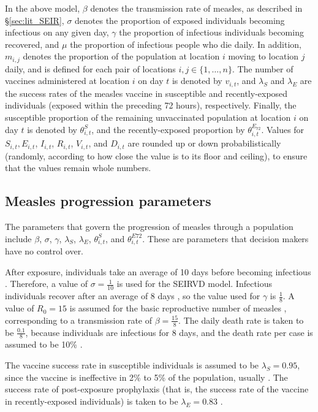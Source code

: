 In the above model, $\beta$ denotes the transmission rate of measles, as described in \S \ref{sec:lit_SEIR}, $\sigma$ denotes the proportion of exposed individuals becoming infectious on any given day, $\gamma$ the proportion of infectious individuals becoming recovered, and $\mu$ the proportion of infectious people who die daily. In addition, $m_{i,j}$ denotes the proportion of the population at location $i$ moving to location $j$ daily, and is defined for each pair of locations $i,j \in \{1,\dots,n \}$. 
The number of vaccines administered at location $i$ on day $t$ is denoted by $v_{i,t}$, and $\lambda_{S}$ and $\lambda_{E}$ are the success rates of the measles vaccine in susceptible and recently-exposed individuals (exposed within the preceding 72 hours), respectively. Finally, the susceptible proportion of the remaining unvaccinated population at location $i$ on day $t$ is denoted by $\theta^{S}_{i,t}$, and the recently-exposed proportion by $\theta^{E_{72}}_{i,t}$. Values for $S_{i,t}, E_{i,t}$, $I_{i,t}$, $R_{i,t}$, $V_{i,t}$, and $D_{i,t}$ are rounded up or down probabilistically (randomly, according to how close the value is to its floor and ceiling), to ensure that the values remain whole numbers. 

\subsection{Measles progression parameters} %
The parameters that govern the progression of measles through a population include $\beta$, $\sigma$, $\gamma$, $\lambda_{S}$, $\lambda_{E}$, $\theta^{S}_{i,t}$, and $\theta^{E72}_{i,t}$. These are parameters that decision makers have no control over.

After exposure, individuals take an average of 10 days before becoming infectious \cite{moss2007measles}. Therefore, a value of $\sigma = \frac{1}{10}$ is used for the SEIRVD model. Infectious individuals recover after an average of 8 days \cite{who_2019}, so the value used for $\gamma$ is $\frac{1}{8}$.
A value of $R_{0} = 15$ is assumed for the basic reproductive number of measles \cite{guerra2017basic}, corresponding to a transmission rate of $\beta = \frac{15}{8}$. The daily death rate is taken to be $\frac{0.1}{8}$, because individuals are infectious for 8 days, and the death rate per case is assumed to be 10\% \cite{moss2007measles}.

The vaccine success rate in susceptible individuals is assumed to be $\lambda_{S} = 0.95$, since the vaccine is ineffective in 2\% to 5\% of the population, usually \cite{cdc_pinkbook_2018}. The success rate of post-exposure prophylaxis (that is, the success rate of the vaccine in recently-exposed individuals) is taken to be $\lambda_{E} = 0.83$ \cite{csiro_2009}. 


